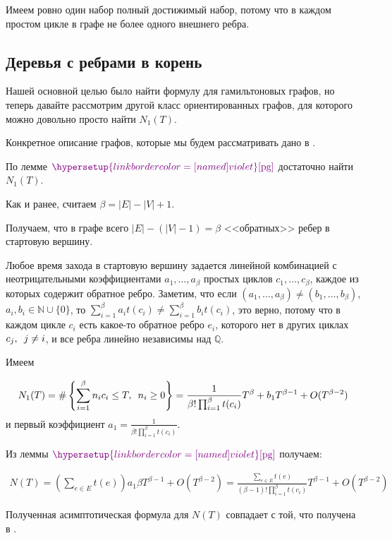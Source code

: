 \documentclass{article}
\makeatletter
\newcommand{\squad}{
    \hspace{0.5em}
}
\let\@msm@th@eqref\eqref
\renewcommand{\eqref}[1]{%
  \begingroup
  \leavevmode
  \color{violet}%
  \hypersetup{linkbordercolor=[named]{violet}}%
  \@msm@th@eqref{#1}%
  \endgroup
}
\makeatother
\begin{document}
Имеем ровно один набор полный достижимый набор, потому что в каждом простом цикле в графе не более одного внешнего ребра.

\subsection{Деревья с ребрами в корень}

Нашей основной целью было найти формулу для гамильтоновых графов, но теперь давайте рассмотрим другой класс ориентированных графов, для которого можно довольно просто найти $N_{1}(T)$.

Конкретное описание графов, которые мы будем рассматривать дано в \cite{2021}.

По лемме $\eqref{pg}$ достаточно найти $N_{1}(T)$.

Как и ранее, считаем $\beta = |E| - |V| + 1$.

Получаем, что в графе всего $|E| - (|V| - 1) = \beta$ <<обратных>> ребер в стартовую вершину.

Любое время захода в стартовую вершину задается линейной комбинацией с неотрицательными коэффициентами $a_{1}, \ldots, a_{\beta}$ простых циклов $c_{1}, \ldots, c_{\beta}$, каждое из которых содержит обратное ребро. 
Заметим, что если $(a_{1}, \ldots, a_{\beta}) \neq (b_{1}, \ldots, b_{\beta})$, $a_{i}, b_{i} \in \mathbb{N} \cup \{0\}$, то $\sum_{i = 1}^{\beta}a_{i}t(c_{i}) \neq \sum_{i = 1}^{\beta}b_{i}t(c_{i})$, это верно, потому что в каждом цикле $c_{i}$ есть какое-то обратное ребро $e_{i}$, которого нет в других циклах $c_{j}, \squad j \neq i$, и все ребра линейно независимы над $\mathbb{Q}$.

Имеем 

\begin{gather*}
    N_{1}(T) = \#\left\{ \sum_{i = 1}^{\beta}{n_{i}c_{i}} \leq T, \squad n_{i} \geq 0\right\} = \frac{1}{\beta!\prod_{i = 1}^{\beta}{t(c_{i})}}T^{\beta} + b_{1}T^{\beta - 1} + O(T^{\beta - 2})
\end{gather*}
и первый коэффициент $a_{1} = \frac{1}{\beta!\prod_{i = 1}^{\beta}{t(c_{i})}}$.

Из леммы $\eqref{pg}$ получаем: 

\begin{gather*}
    N(T) = \left(\sum_{e \in E}{t(e)}\right)a_{1}\beta T^{\beta - 1} + O(T^{\beta - 2}) = \frac{\sum_{e \in E}{t(e)}}{(\beta - 1)!\prod_{i = 1}^{\beta}{t(c_{i})}}T^{\beta - 1} + O(T^{\beta - 2})
\end{gather*}

Полученная асимптотическая формула для $N(T)$ совпадает с той, что получена в \cite{2021}.









\end{document}
